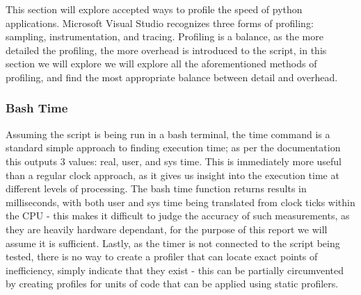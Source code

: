This section will explore accepted ways to profile the speed of python applications.
Microsoft Visual Studio recognizes three forms of profiling: sampling, instrumentation, and
tracing\cite{MicrosoftProfiling}.
Profiling is a balance, as the more detailed the profiling, the more overhead is introduced to the script, in this
section we will explore we will explore all the aforementioned methods of profiling, and find the most appropriate
balance between detail and overhead.

\subsubsection{Bash Time}\label{subsubsec:bash_time}
Assuming the script is being run in a bash terminal, the time command\cite{BashTime} is a standard
simple approach to finding execution time; as per the documentation this outputs 3 values: real, user, and sys time.
This is immediately more useful than a regular clock approach, as it gives us insight into the execution time at
different levels of processing.
The bash time function returns results in milliseconds, with both user and sys time being translated from clock ticks
within the CPU - this makes it difficult to judge the accuracy of such measurements, as they are heavily hardware
dependant, for the purpose of this report we will assume it is sufficient.
Lastly, as the timer is not connected to the script being tested, there is no way to create a profiler that can locate
exact points of inefficiency, simply indicate that they exist - this can be partially circumvented by creating
profiles for units of code that can be applied using static profilers.


